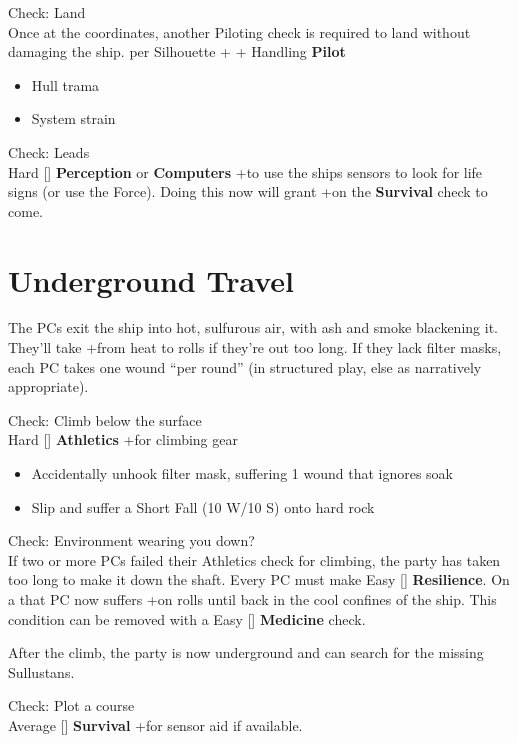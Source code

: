 \documentclass{book}
\newcommand{\df}{\difficulty}
\newcommand{\stb}{\setback}
\begin{document}
\begin{multicols}{2}
Check: Land\\
Once at the coordinates, another Piloting check is required to land without damaging the ship.
\difficulty per Silhouette + \stb\stb + Handling \textbf{Pilot}
\begin{itemize}
    \item \failure Hull trama
    \item \threat System strain
\end{itemize}

Check: Leads\\
Hard [\df\df\df] \textbf{Perception} or \textbf{Computers} +\setback to use the ships sensors to look for life signs (or use the Force). Doing this now will grant +\boost on the \textbf{Survival} check to come.

\section{Underground Travel}

The PCs exit the ship into hot, sulfurous air, with ash and smoke blackening it. They’ll take +\setback from heat to rolls if they’re out too long. If they lack filter masks, each PC takes one wound ``per round'' (in structured play, else as narratively appropriate).

Check: Climb below the surface\\
Hard [\df\df\df] \textbf{Athletics} +\boost for climbing gear
\begin{itemize}
  \item \threat\threat Accidentally unhook filter mask, suffering 1 wound that ignores soak
  \item \despair Slip and suffer a  Short Fall (10 W/10 S) onto hard rock
\end{itemize}

Check: Environment wearing you down?\\
If two or more PCs failed their Athletics check for climbing, the party has taken too long to make it down the shaft. Every PC must make Easy [\df] \textbf{Resilience}. On a \failure that PC now suffers +\setback on rolls until back in the cool confines of the ship. This condition can be removed with a Easy [\df] \textbf{Medicine} check.

After the climb, the party is now underground and can search for the missing Sullustans. 

Check: Plot a course\\
Average [\df\df] \textbf{Survival} +\boost for sensor aid if available.


\end{multicols}
\end{document}

